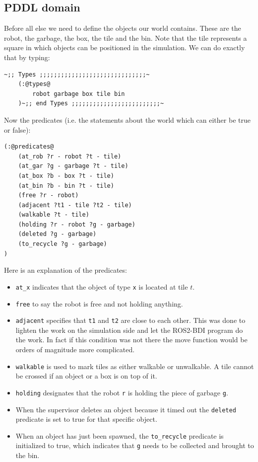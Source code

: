 \subsection{PDDL domain}
Before all else we need to define the objects our world contains. These are the robot, the garbage, the box, the tile and the bin. Note that the tile represents a square in which objects can be positioned in the simulation. We can do exactly that by typing:  
\begin{lstlisting}[caption=PDDL 2.1 domain]
~;; Types ;;;;;;;;;;;;;;;;;;;;;;;;;;;;;;~
    (:@types@
        robot garbage box tile bin
    )~;; end Types ;;;;;;;;;;;;;;;;;;;;;;;;;~
\end{lstlisting}
Now the predicates (i.e. the statements about the world which can either be true or false):
\begin{lstlisting}[caption=Predicates definition]
(:@predicates@
    (at_rob ?r - robot ?t - tile)
    (at_gar ?g - garbage ?t - tile)
    (at_box ?b - box ?t - tile)
    (at_bin ?b - bin ?t - tile)
    (free ?r - robot)
    (adjacent ?t1 - tile ?t2 - tile)
    (walkable ?t - tile)
    (holding ?r - robot ?g - garbage)
    (deleted ?g - garbage)
    (to_recycle ?g - garbage)
)
\end{lstlisting}
Here is an explanation of the predicates:
\begin{itemize}
    \item \texttt{at\_x} indicates that the object of type \texttt{x} is located at tile $t$.
    \item \texttt{free} to say the robot is free and not holding anything.
    \item \texttt{adjacent} specifies that \texttt{t1} and \texttt{t2} are close to each other. This was done to lighten the work on the simulation side and let the ROS2-BDI program do the work. In fact if this condition was not there the move function would be orders of magnitude more complicated.
    \item \texttt{walkable} is used to mark tiles as either walkable or unwalkable. A tile cannot be crossed if an object or a box is on top of it.
    \item \texttt{holding} designates that the robot \texttt{r} is holding the piece of garbage \texttt{g}.
    \item When the supervisor deletes an object because it timed out the \texttt{deleted} predicate is set to true for that specific object.
    \item When an object has just been spawned, the \texttt{to\_recycle} predicate is initialized to true, which indicates that \texttt{g} needs to be collected and brought to the bin.
\end{itemize}
